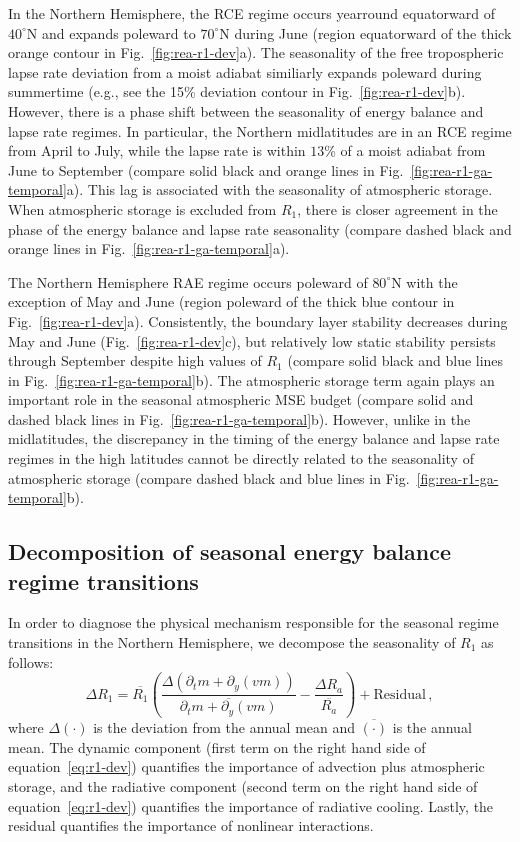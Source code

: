 \documentclass{ametsocV5}
\begin{document}
    In the Northern Hemisphere, the RCE regime occurs yearround equatorward of $40^\circ$N and expands poleward to $70^\circ$N during June (region equatorward of the thick orange contour in Fig.~\ref{fig:rea-r1-dev}a). The seasonality of the free tropospheric lapse rate deviation from a moist adiabat similiarly expands poleward during summertime (e.g., see the 15\% deviation contour in Fig.~\ref{fig:rea-r1-dev}b). However, there is a phase shift between the seasonality of energy balance and lapse rate regimes. In particular, the Northern midlatitudes are in an RCE regime from April to July, while the lapse rate is within $13$\% of a moist adiabat from June to September (compare solid black and orange lines in Fig.~\ref{fig:rea-r1-ga-temporal}a). This lag is associated with the seasonality of atmospheric storage. When atmospheric storage is excluded from $R_1$, there is closer agreement in the phase of the energy balance and lapse rate seasonality (compare dashed black and orange lines in Fig.~\ref{fig:rea-r1-ga-temporal}a).

    The Northern Hemisphere RAE regime occurs poleward of $80^\circ$N with the exception of May and June (region poleward of the thick blue contour in Fig.~\ref{fig:rea-r1-dev}a). Consistently, the boundary layer stability decreases during May and June (Fig.~\ref{fig:rea-r1-dev}c), but relatively low static stability persists through September despite high values of $R_1$ (compare solid black and blue lines in Fig.~\ref{fig:rea-r1-ga-temporal}b). The atmospheric storage term again plays an important role in the seasonal atmospheric MSE budget (compare solid and dashed black lines in Fig.~\ref{fig:rea-r1-ga-temporal}b). However, unlike in the midlatitudes, the discrepancy in the timing of the energy balance and lapse rate regimes in the high latitudes cannot be directly related to the seasonality of atmospheric storage (compare dashed black and blue lines in Fig.~\ref{fig:rea-r1-ga-temporal}b).

    \subsection{Decomposition of seasonal energy balance regime transitions}
    In order to diagnose the physical mechanism responsible for the seasonal regime transitions in the Northern Hemisphere, we decompose the seasonality of $R_1$ as follows:
    \begin{equation}\label{eq:r1-dev}
      \Delta R_1 = \overline{R_1}\left( \frac{\Delta(\partial_t m + \partial_y (vm))}{\overline{\partial_t m + \partial_y (vm)}}  - \frac{\Delta R_a }{\overline{R_a}}\right) + \mathrm{Residual} \, ,
    \end{equation}
    where $\Delta(\cdot)$ is the deviation from the annual mean and $\overline{(\cdot)}$ is the annual mean. The dynamic component (first term on the right hand side of equation~\ref{eq:r1-dev}) quantifies the importance of advection plus atmospheric storage, and the radiative component (second term on the right hand side of equation~\ref{eq:r1-dev}) quantifies the importance of radiative cooling. Lastly, the residual quantifies the importance of nonlinear interactions.
\end{document}

